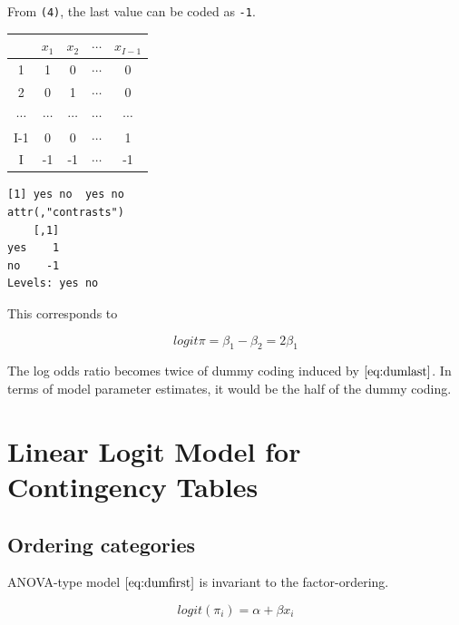 \documentclass[]{book}
\newenvironment{Shaded}{\begin{snugshade}}{\end{snugshade}}
\newcommand{\DataTypeTok}[1]{\textcolor[rgb]{0.13,0.29,0.53}{#1}}
\newcommand{\KeywordTok}[1]{\textcolor[rgb]{0.13,0.29,0.53}{\textbf{#1}}}
\newcommand{\NormalTok}[1]{#1}
\newcommand{\OperatorTok}[1]{\textcolor[rgb]{0.81,0.36,0.00}{\textbf{#1}}}
\newcommand{\StringTok}[1]{\textcolor[rgb]{0.31,0.60,0.02}{#1}}
\begin{document}
From \texttt{(4)}, the last value can be coded as \texttt{-1}.

\begin{longtable}[]{@{}ccccc@{}}
\toprule
& \(x_1\) & \(x_2\) & \(\cdots\) & \(x_{I-1}\)\tabularnewline
\midrule
\endhead
1 & 1 & 0 & \(\cdots\) & 0\tabularnewline
2 & 0 & 1 & \(\cdots\) & 0\tabularnewline
\(\cdots\) & \(\cdots\) & \(\cdots\) & \(\cdots\) & \(\cdots\)\tabularnewline
I-1 & 0 & 0 & \(\cdots\) & 1\tabularnewline
I & -1 & -1 & \(\cdots\) & -1\tabularnewline
\bottomrule
\end{longtable}

\begin{Shaded}
\end{Shaded}

\begin{verbatim}
[1] yes no  yes no 
attr(,"contrasts")
    [,1]
yes    1
no    -1
Levels: yes no
\end{verbatim}

This corresponds to

\[logit\pi = \beta_1 - \beta_2 = 2\beta_1\]

The log odds ratio becomes twice of dummy coding induced by \(\eqref{eq:dumlast}\). In terms of model parameter estimates, it would be the half of the dummy coding.

\hypertarget{linear-logit-model-for-contingency-tables}{%
\section{Linear Logit Model for Contingency Tables}\label{linear-logit-model-for-contingency-tables}}

\hypertarget{ordering-categories}{%
\subsection{Ordering categories}\label{ordering-categories}}

ANOVA-type model \(\eqref{eq:dumfirst}\) is invariant to the factor-ordering.

\begin{equation}
logit(\pi_i) = \alpha + \beta x_i
\label{eq:anovorder}
\end{equation}
\end{document}
